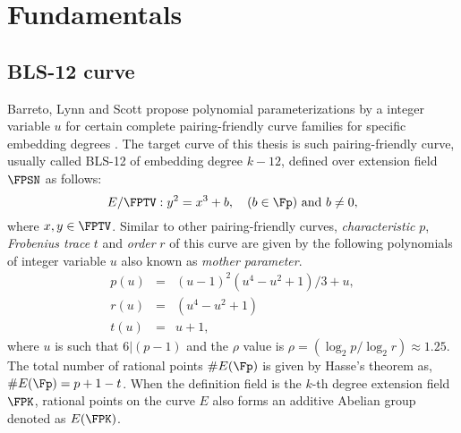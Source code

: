 \section{Fundamentals}
\subsection{BLS-12 curve}
Barreto, Lynn and Scott propose polynomial parameterizations by a integer variable $u$ for certain complete pairing-friendly curve families for specific embedding degrees \cite{SCN:BarLynSco02}. The target curve of this thesis is such pairing-friendly curve, usually called BLS-12 of embedding degree $k-12$, defined over extension field $\FPSN$ as follows:
\begin{equation}\label{eq:KSS_16}
E/\FPTV:y^2=x^3+b, \quad \mbox{($b \in \Fp$) and  $b \neq 0$},
\end{equation}
 where $x,y \in \FPTV$. Similar to other pairing-friendly curves,  \textit{characteristic} $p$, \textit{Frobenius trace} $t$ and \textit{order} $r$ of this curve are given by the following polynomials of  integer variable $u$ also known as \textit{mother parameter}.
\begin{subequations}
\begin{eqnarray}
p(u) &= & (u-1)^2(u^4-u^2+1)/3+u,  \\\label{eq:kss_16_char}
r(u) &= & (u^4-u^2+1)\label{eq:kss_16_degree}  \\
t(u) &=& u+1, \label{eq:kss_16_trace} 
\end{eqnarray}
\end{subequations} 
where $u$ is such that $6|(p-1)$ and the $\rho$ value is $\rho = (\log_2 p/\log_2 r) \approx 1.25$. 
The total number of rational points $\#E(\Fp)$ is given by Hasse's theorem as, $\#E(\Fp) = p+1-t$. 
When the definition field is the $k$-th degree extension field $\FPK$, rational points on the curve $E$ also forms an additive Abelian group denoted as $E(\FPK)$.

